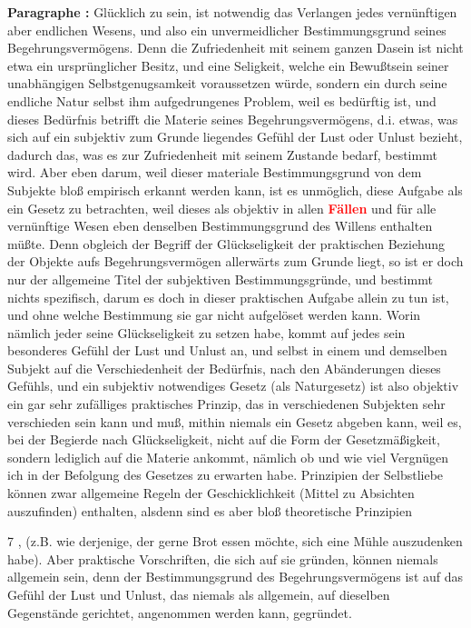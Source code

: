\documentclass[a4paper,12pt,twoside]{book}
\newcommand{\match}[1]{\textcolor{red}{\textbf{#1}}}
\begin{document}
	\textbf{Paragraphe : }Glücklich zu sein, ist notwendig das Verlangen jedes vernünftigen aber endlichen Wesens, und also ein unvermeidlicher Bestimmungsgrund seines Begehrungsvermögens. Denn die Zufriedenheit mit seinem ganzen Dasein ist nicht etwa ein ursprünglicher Besitz, und eine Seligkeit, welche ein Bewußtsein seiner unabhängigen Selbstgenugsamkeit voraussetzen würde, sondern ein durch seine endliche Natur selbst ihm aufgedrungenes Problem, weil es bedürftig ist, und dieses Bedürfnis betrifft die Materie seines Begehrungsvermögens, d.i. etwas, was sich auf ein subjektiv zum Grunde liegendes Gefühl der Lust oder Unlust bezieht, dadurch das, was es zur Zufriedenheit mit seinem Zustande bedarf, bestimmt wird. Aber eben darum, weil dieser materiale Bestimmungsgrund von dem Subjekte bloß empirisch erkannt werden kann, ist es unmöglich, diese Aufgabe als ein Gesetz zu betrachten, weil dieses als objektiv in allen \match{Fällen} und für alle vernünftige Wesen eben denselben Bestimmungsgrund des Willens enthalten müßte. Denn obgleich der Begriff der Glückseligkeit der praktischen Beziehung der Objekte aufs Begehrungsvermögen allerwärts zum Grunde liegt, so ist er doch nur der allgemeine Titel der subjektiven Bestimmungsgründe, und bestimmt nichts spezifisch, darum es doch in dieser praktischen Aufgabe allein zu tun ist, und ohne welche Bestimmung sie gar nicht aufgelöset werden kann. Worin nämlich jeder seine Glückseligkeit zu setzen habe, kommt auf jedes sein besonderes Gefühl der Lust und Unlust an, und selbst in einem und demselben Subjekt auf die Verschiedenheit der Bedürfnis, nach den Abänderungen dieses Gefühls, und ein subjektiv notwendiges Gesetz (als Naturgesetz) ist also objektiv ein gar sehr zufälliges praktisches Prinzip, das in verschiedenen Subjekten sehr verschieden sein kann und  muß, mithin niemals ein Gesetz abgeben kann, weil es, bei der Begierde nach Glückseligkeit, nicht auf die Form der Gesetzmäßigkeit, sondern lediglich auf die Materie ankommt, nämlich ob und wie viel Vergnügen ich in der Befolgung des Gesetzes zu erwarten habe. Prinzipien der Selbstliebe können zwar allgemeine Regeln der Geschicklichkeit (Mittel zu Absichten auszufinden) enthalten, alsdenn sind es aber bloß theoretische Prinzipien
	
	
	7
	, (z.B. wie derjenige, der gerne Brot essen möchte, sich eine Mühle auszudenken habe). Aber praktische Vorschriften, die sich auf sie gründen, können niemals allgemein sein, denn der Bestimmungsgrund des Begehrungsvermögens ist auf das Gefühl der Lust und Unlust, das niemals als allgemein, auf dieselben Gegenstände gerichtet, angenommen werden kann, gegründet. 
	
\end{document}
